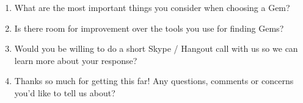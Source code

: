 \begin{enumerate}
  \item \hspace{1pt} What are the most important things you consider when choosing a Gem?

  \item \hspace{1pt} Is there room for improvement over the tools you use for finding Gems?

  \item \hspace{1pt} Would you be willing to do a short Skype / Hangout call with us so we can learn more about your response?

  \item \hspace{1pt} Thanks so much for getting this far! Any questions, comments or concerns you'd like to tell us about?

\end{enumerate}

